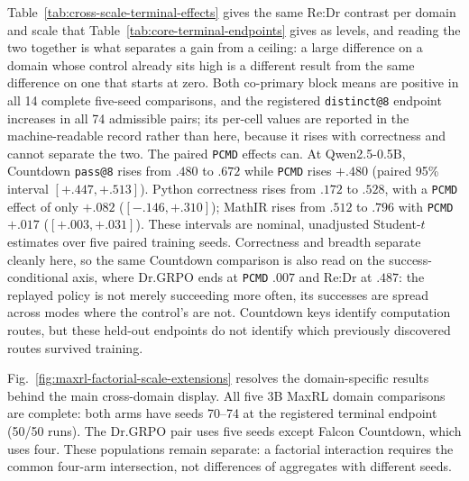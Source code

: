 \documentclass{article}
\makeatletter
\newcommand{\1}{\mathbf 1}
\newcommand{\pmd}{\texttt{PCMD}}
\newcommand{\distk}{\texttt{distinct@8}}
\theoremstyle{remark}
\theoremstyle{definition}
\theoremstyle{plain}
\makeatother
\begin{document}
Table~\ref{tab:cross-scale-terminal-effects} gives the same Re:Dr contrast per
domain and scale that Table~\ref{tab:core-terminal-endpoints} gives as levels,
and reading the two together is what separates a gain from a ceiling: a large
difference on a domain whose control already sits high is a different result
from the same difference on one that starts at zero. Both co-primary block
means are positive in all 14 complete five-seed comparisons, and the registered
\distk{} endpoint increases in all 74 admissible pairs; its per-cell values are reported in the machine-readable
record rather than here, because it rises with correctness and cannot separate
the two. The paired \pmd{} effects can. At Qwen2.5-0.5B, Countdown
\texttt{pass@8} rises from $.480$ to $.672$ while \pmd{} rises $+.480$ (paired
95\% interval $[+.447,+.513]$). Python correctness rises from $.172$ to $.528$,
with a \pmd{} effect of only $+.082$ ($[-.146,+.310]$); MathIR rises from
$.512$ to $.796$ with \pmd{} $+.017$ ($[+.003,+.031]$). These intervals are
nominal, unadjusted Student-$t$ estimates over five paired training seeds.
Correctness and breadth separate cleanly here, so the same Countdown
comparison is also read on the
success-conditional axis, where Dr.GRPO ends at \pmd{} $.007$ and
Re:Dr at $.487$: the replayed policy is not merely succeeding more
often, its successes are spread across modes where the control's are not. Countdown keys identify computation routes, but
these held-out endpoints do not identify which previously discovered
routes survived training.


Fig.~\ref{fig:maxrl-factorial-scale-extensions} resolves the domain-specific
results behind the main cross-domain display. All five 3B MaxRL domain comparisons are complete:
both arms have seeds 70--74 at the registered terminal endpoint (50/50 runs).
The Dr.GRPO pair uses five seeds except Falcon Countdown, which uses four. These populations
remain separate: a factorial interaction requires the common four-arm
intersection, not differences of aggregates with different seeds.
\end{document}
